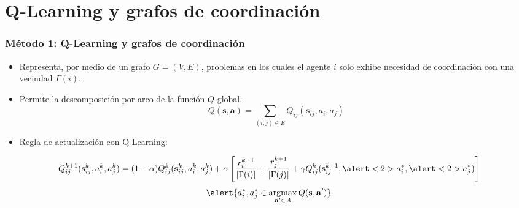 \documentclass[11pt]{beamer}
\DeclareMathOperator*{\argmax}{argmax}
\begin{document}
\section{Q-Learning y grafos de coordinación}
\begin{frame}
\frametitle{Método 1: Q-Learning y grafos de coordinación}
\begin{itemize}
\item Representa, por medio de un grafo $G=(V,E)$, problemas en los cuales el agente $i$ solo exhibe necesidad de coordinación con una vecindad $\Gamma(i)$.\\
\item Permite la descomposición por arco de la función $Q$ global.
\small
\begin{equation*}
Q(\mathbf{s},\mathbf{a})=\sum_{(i,j)\in E}Q_{ij}(\mathbf{s}_{ij},a_i,a_j)
\end{equation*}
\normalsize
\item Regla de actualización con Q-Learning\footnotemark:
\end{itemize}
\small
\begin{equation*}
Q_{ij}^{k+1}(\mathbf{s}_{ij}^k,a_i^k,a_j^k) = (1-\alpha)Q_{ij}^k(\mathbf{s}_{ij}^k,a_i^k,a_j^k) + \alpha\left[ \frac{r_i^{k+1}}{|\Gamma(i)|}+\frac{r_j^{k+1}}{|\Gamma(j)|}+\gamma Q_{ij}^k(\mathbf{s}_{ij}^{k+1},\alert<2>{a_i^*},\alert<2>{a_j^*}) \right]
\end{equation*}
\normalsize
\pause
\bigskip
\small
\begin{equation*}
\alert{a_i^*, a_j^* \in \argmax_{\mathbf{a}^\prime \in \mathcal{A}}Q(\mathbf{s},\mathbf{a}^\prime)}
\end{equation*}
\normalsize
{}
\end{frame}
\end{document}
